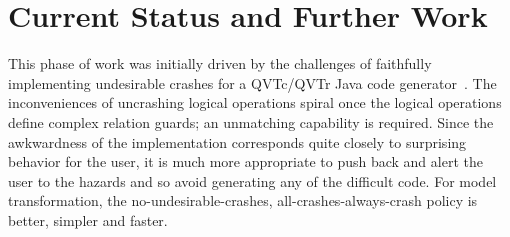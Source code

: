 \documentclass[
]{ceurart}
\begin{document}





\section{Current Status and Further Work}\label{Current Status and Further Work}

This phase of work was initially driven by the challenges of faithfully implementing undesirable crashes for a QVTc/QVTr Java code generator~\cite{Eclipse-QVTd}. The inconveniences of uncrashing logical operations spiral once the logical operations define complex relation guards; an unmatching capability is required. Since the awkwardness of the implementation corresponds quite closely to surprising behavior for the user, it is much more appropriate to push back and alert the user to the hazards and so avoid generating any of the difficult code. For model transformation, the no-undesirable-crashes, all-crashes-always-crash policy is better, simpler and faster.
\end{document}
